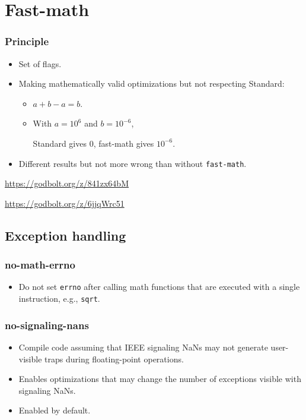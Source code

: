 \documentclass{beamer}
\begin{document}
\section{Fast-math}

\begin{frame}
    \tableofcontents[currentsection]
\end{frame}

\begin{frame}[fragile]
    \frametitle{Principle}

    \begin{itemize}
        \item Set of flags.
        \item Making mathematically valid optimizations but not respecting Standard:
              \begin{itemize}
                  \item $a+b-a = b$.
                  \item With $a = 10^6$ and $b = 10^{-6}$,

                        Standard gives $0$, fast-math gives $10^{-6}$.
              \end{itemize}
        \item Different results but not more wrong than without \verb'fast-math'.
    \end{itemize}

    \url{https://godbolt.org/z/841zx64bM}

    \url{https://godbolt.org/z/6jjqWrc51}
\end{frame}

\subsection{Exception handling}

\begin{frame}[fragile]
    \frametitle{no-math-errno}

    \begin{itemize}
        \item Do not set \verb'errno' after calling math functions that are executed with a single instruction, e.g., \verb'sqrt'.
    \end{itemize}
\end{frame}

\begin{frame}[fragile]
    \frametitle{no-signaling-nans}

    \begin{itemize}
        \item Compile code assuming that IEEE signaling NaNs may not generate user-visible traps during floating-point operations.
        \item Enables optimizations that may change the number of exceptions visible with signaling NaNs.
        \item Enabled by default.
    \end{itemize}
\end{frame}
\end{document}
